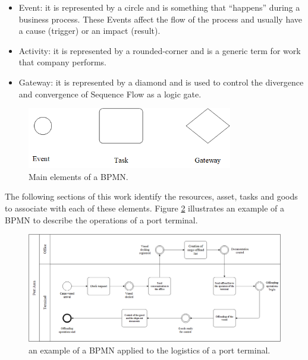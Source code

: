 \begin{itemize}
    \item Event: it is represented by a circle and is something that “happens” during a business process. These Events affect the flow of the process and usually have a cause (trigger) or an impact (result). 
    \item Activity: it is represented by a rounded-corner and is a generic term for work that company performs. 
    \item Gateway: it is represented by a diamond and is used to control the divergence and convergence of Sequence Flow as a logic gate.

\end{itemize}

\begin{figure}[hbt!]
\centering
\includegraphics[width=0.8\textwidth]{SectionLetsMath/logicalModelling_figures/fig_BPMN.png}
\captionsetup{type=figure}
\caption{Main elements of a BPMN.}
\label{fig_BPMN}
\end{figure}

The following sections of this work identify the resources, asset, tasks and goods to associate with each of these elements. Figure \ref{fig_es_BPMN} illustrates an example of a BPMN to describe the operations of a port terminal.\par 

\begin{landscape}
\thispagestyle{empty}
\begin{figure}[hbt!]
\centering
\includegraphics[width=1.3\textwidth]{SectionLetsMath/logicalModelling_figures/fig_es_BPMN.png}
\captionsetup{type=figure}
\caption{an example of a BPMN applied to the logistics of a port terminal.}
\label{fig_es_BPMN}
\vfill
\end{figure}
\end{landscape}


